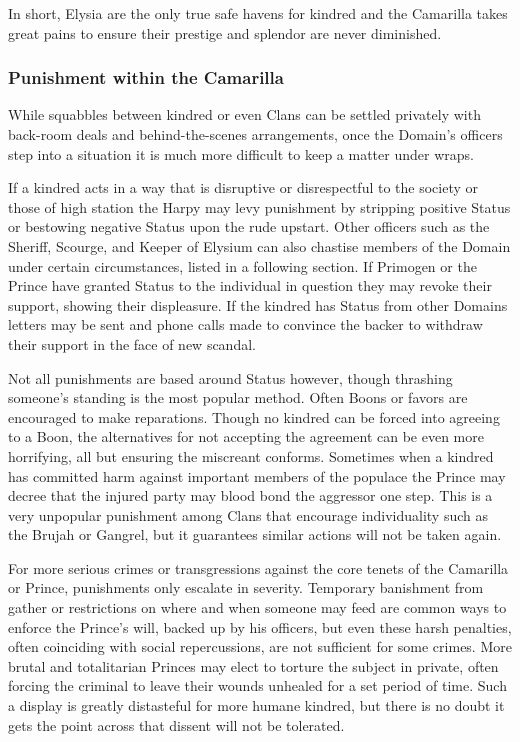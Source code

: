 In short, Elysia are the only true safe havens for kindred and the Camarilla takes 
great pains to ensure their prestige and splendor are never diminished.

\subsubsection{Punishment within the Camarilla}
While squabbles between kindred or even Clans can be settled privately with 
back-room deals and behind-the-scenes arrangements, once the Domain's officers 
step into a situation it is much more difficult to keep a matter under wraps.  

If a kindred acts in a way that is disruptive or disrespectful to the society 
or those of high station the Harpy may levy punishment by stripping positive 
Status or bestowing negative Status upon the rude upstart.  Other officers such 
as the Sheriff, Scourge, and Keeper of Elysium can also chastise members of the 
Domain under certain circumstances, listed in a following section.  If Primogen 
or the Prince have granted Status to the individual in question they may revoke 
their support, showing their displeasure.  If the kindred has Status from other 
Domains letters may be sent and phone calls made to convince the backer to 
withdraw their support in the face of new scandal.

Not all punishments are based around Status however, though thrashing someone's 
standing is the most popular method.  Often Boons or favors are encouraged to 
make reparations.  Though no kindred can be forced into agreeing to a Boon, the 
alternatives for not accepting the agreement can be even more horrifying, all but 
ensuring the miscreant conforms.  Sometimes when a kindred has committed harm 
against important members of the populace the Prince may decree that the injured 
party may blood bond the aggressor one step.  This is a very unpopular punishment 
among Clans that encourage individuality such as the Brujah or Gangrel, but it 
guarantees similar actions will not be taken again.

For more serious crimes or transgressions against the core tenets of the 
Camarilla or Prince, punishments only escalate in severity.  Temporary banishment 
from gather or restrictions on where and when someone may feed are common ways to 
enforce the Prince's will, backed up by his officers, but even these harsh 
penalties, often coinciding with social repercussions, are not sufficient for 
some crimes.  More brutal and totalitarian Princes may elect to torture the 
subject in private, often forcing the criminal to leave their wounds unhealed for a 
set period of time.  Such a display is greatly distasteful for more humane kindred, 
but there is no doubt it gets the point across that dissent will not be tolerated.

